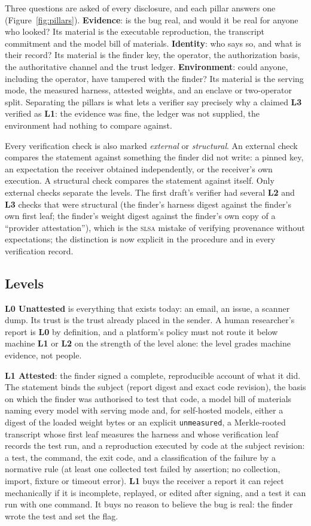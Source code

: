 \documentclass[11pt]{article}
\newcommand{\slsa}{\textsc{slsa}}
\newcommand{\lvl}[1]{\textbf{L#1}}
\begin{document}
Three questions are asked of every disclosure, and each pillar answers one (Figure~\ref{fig:pillars}).
\textbf{Evidence}: is the bug real, and would it be real for anyone who looked? Its material is the executable
reproduction, the transcript commitment and the model bill of materials. \textbf{Identity}: who says so, and
what is their record? Its material is the finder key, the operator, the authorization basis, the
authoritative channel and the trust ledger. \textbf{Environment}: could anyone, including the operator, have
tampered with the finder? Its material is the serving mode, the measured harness, attested weights, and an
enclave or two-operator split. Separating the pillars is what lets a verifier say precisely why a claimed
\lvl{3} verified as \lvl{1}: the evidence was fine, the ledger was not supplied, the environment had nothing to
compare against.

Every verification check is also marked \emph{external} or \emph{structural}. An external check compares the
statement against something the finder did not write: a pinned key, an expectation the receiver obtained
independently, or the receiver's own execution. A structural check compares the statement against itself.
Only external checks separate the levels. The first draft's verifier had several \lvl{2} and \lvl{3} checks that
were structural (the finder's harness digest against the finder's own first leaf; the finder's weight digest
against the finder's own copy of a ``provider attestation''), which is the \slsa{} mistake of verifying
provenance without expectations; the distinction is now explicit in the procedure and in every verification
record.

\subsection{Levels}

\textbf{\lvl{0} Unattested} is everything that exists today: an email, an issue, a scanner dump. Its trust is the
trust already placed in the sender. A human researcher's report is \lvl{0} by definition, and a platform's policy
must not route it below machine \lvl{1} or \lvl{2} on the strength of the level alone: the level grades machine
evidence, not people.

\textbf{\lvl{1} Attested}: the finder signed a complete, reproducible account of what it did. The statement binds
the subject (report digest and exact code revision), the basis on which the finder was authorised to test that
code, a model bill of materials naming every model with serving mode and, for self-hosted models, either a
digest of the loaded weight bytes or an explicit \texttt{unmeasured}, a Merkle-rooted transcript whose first
leaf measures the harness and whose verification leaf records the test run, and a reproduction executed by
code at the subject revision: a test, the command, the exit code, and a classification of the failure by a
normative rule (at least one collected test failed by assertion; no collection, import, fixture or timeout
error). \lvl{1} buys the receiver a report it can reject mechanically if it is incomplete, replayed, or edited
after signing, and a test it can run with one command. It buys no reason to believe the bug is real: the
finder wrote the test and set the flag.
\end{document}
